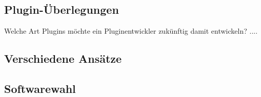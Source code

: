  \label{sec:Vorüberlegungen}

\subsection{Plugin-Überlegungen}

Welche Art Plugins möchte ein Pluginentwickler zukünftig damit entwickeln?
....

\subsection{Verschiedene Ansätze}

\subsection{Softwarewahl}

